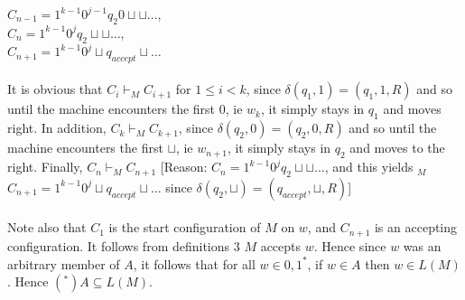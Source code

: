\documentclass[a4paper,12pt]{article}
\begin{document}
$C_{n-1} = 1^{k-1} 0^{j-1} q_2 0 \sqcup \sqcup \dots$, \\
$C_n = 1^{k-1} 0^j q_2 \sqcup \sqcup \dots$, \\
$C_{n+1} = 1^{k-1} 0^j \sqcup q_{accept} \sqcup \dots$ \\
\\
It is obvious that $C_i \vdash_M C_{i+1}$ for $1 \leq i < k$, since 
$\delta ( q_1 , 1 ) = ( q_1 , 1 , R )$ and so until the machine encounters the first $0$, ie $w_k$, it simply stays in $q_1$ and moves right. In  addition, $C_k \vdash_M C_{k+1}$, since 
$\delta ( q_2 , 0 ) = ( q_2 , 0 , R )$ and so until the machine encounters the first $\sqcup$, ie $w_{n+1}$, it simply stays in $q_2$ and moves to the right. Finally, $C_n \vdash_M C_{n+1}$ [Reason: $C_n = 1^{k-1} 0^j q_2 \sqcup \sqcup \dots$, and this yields $_M$ $C_{n+1} = 1^{k-1} 0^j \sqcup q_{accept} \sqcup \dots$ since $\delta ( q_2 , \sqcup ) = ( q_{accept} , \sqcup , R )$]  \\
\\
Note also that $C_1$ is the start configuration of $M$ on $w$, and $C_{n+1}$ is an accepting configuration. It follows from definitions 3 $M$ accepts $w$. Hence since $w$ was an arbitrary member of $A$, it follows that for all $w \in {0,1}^*$, if $w \in A$ then $w \in L(M)$. Hence $(^*) A \subseteq L(M)$. \\
\end{document}
